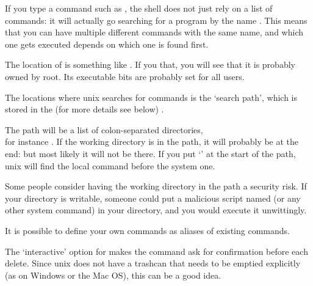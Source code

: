 If you type a command such as , the shell does not just rely on
a list of commands: it will actually go searching for a program by the
name . This means that you can have multiple different commands
with the same name, and which one gets executed depends on which one
is found first.

{The location of  is something like . If you
   that, you will see that it is probably owned by root. Its
  executable bits are probably set for all users.}{}

The locations where unix searches for commands is the `search path',
which is stored in the  (for more
details see below) .

{The path will be a list of colon-separated directories,\\ for
  instance . If the working
  directory is in the path, it will probably be at the end:
    but most likely it will not be there. If you
  put `' at the start of the path, unix will find the local
   command before the system one.}{}

Some people consider having the working directory in the path a
security risk. If your directory is writable, someone could put a
malicious script named  (or any other system command) in your
directory, and you would execute it unwittingly.

It is possible to define your own commands as aliases of existing
commands.

{The  `interactive' option for  
  makes the command ask for confirmation
  before each delete. Since unix does not have a trashcan that needs
  to be emptied explicitly (as on Windows or the Mac OS),
  this can be a good idea.}{}

